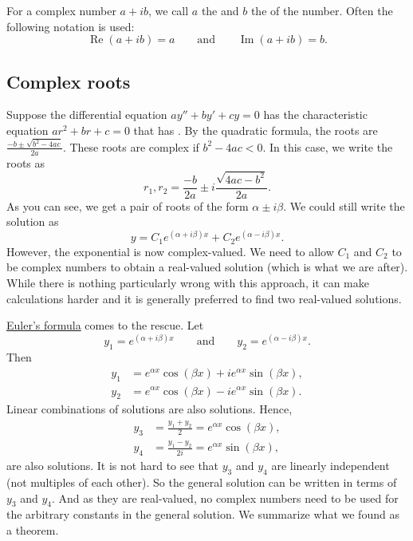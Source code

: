 For a complex number $a+ib$, we call
$a$ the \emph{} and $b$ the \emph{} of the number.
Often the following notation is used:
\begin{equation*}
\operatorname{Re}(a+ib) = a
\qquad \text{and} \qquad
\operatorname{Im}(a+ib) = b.
\end{equation*}

\subsection{Complex roots}

Suppose the differential equation $ay'' + by' + cy = 0$ has the 
characteristic equation
$a r^2 + b r + c = 0$ that has .
By the quadratic
formula, the roots are
$\frac{-b \pm \sqrt{b^2 - 4ac}}{2a}$.
These roots are complex if $b^2 - 4ac < 0$.  In this case, we
write the roots as
\begin{equation*}
r_1, r_2 = \frac{-b}{2a} \pm i\frac{\sqrt{4ac - b^2}}{2a} .
\end{equation*}
As you can see, we get a pair of roots of the form $\alpha \pm i
\beta$.  We could still write the solution as
\begin{equation*}
y = C_1 e^{(\alpha+i\beta)x} + C_2 e^{(\alpha-i\beta)x} .
\end{equation*}
However, the exponential is now complex-valued.  We need to allow
$C_1$ and $C_2$ to be complex numbers to obtain a real-valued solution (which
is what we are after).  While there is nothing particularly wrong with this
approach,
it can make calculations harder and it is generally preferred
to find two real-valued
solutions.

\hyperref[eulersformula]{Euler's formula} comes to the rescue.  Let
\begin{equation*}
y_1 = e^{(\alpha+i\beta)x} \qquad \text{and} \qquad y_2 = e^{(\alpha-i\beta)x} .
\end{equation*}
Then 
\begin{equation*}
\begin{aligned}
y_1 & = e^{\alpha x} \cos (\beta x) + i e^{\alpha x} \sin (\beta x) , \\
y_2 & = e^{\alpha x} \cos (\beta x) - i e^{\alpha x} \sin (\beta x) .
\end{aligned}
\end{equation*}
Linear combinations of solutions are also solutions.  Hence,
\begin{equation*}
\begin{aligned}
y_3 & = \frac{y_1 + y_2}{2} = e^{\alpha x} \cos (\beta x) , \\ 
y_4 & = \frac{y_1 - y_2}{2i} = e^{\alpha x} \sin (\beta x) ,
\end{aligned}
\end{equation*}
are also solutions.
It is not hard to
see that $y_3$ and $y_4$ are linearly independent (not multiples of each other).
So the general solution can be written in terms of $y_3$ and $y_4$.
And as they are real-valued,
no complex numbers need to be used for the arbitrary constants in the
general solution.
We summarize what we found as a theorem.

